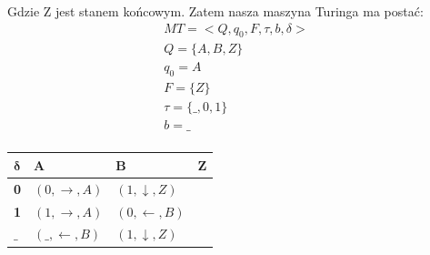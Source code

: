 \documentclass[12pt]{article}
\begin{document}
    Gdzie Z jest stanem końcowym. Zatem nasza maszyna Turinga ma postać:
    \begin{gather*}
        MT = <Q, q_0, F, \tau, b, \delta>\\
        Q = \{A, B, Z\}\\
        q_0 = A\\
        F = \{Z\}\\
        \tau = \{ \_, 0, 1\}\\
        b = \_ \\
    \end{gather*}
    \begin{table}[H]
        \begin{center}
            \begin{tabular}{| p{1cm} || p{5cm} | p{5cm} | p{1cm} |}
                \hline
                $\boldsymbol{\delta}$ & \textbf{A} & \textbf{B} & \textbf{Z}\\
                \hline
                \hline
                \textbf{0} & $(0, \rightarrow, A)$ & $(1, \downarrow, Z)$ &\\
                \hline
                \textbf{1} & $(1, \rightarrow, A)$ & $(0, \leftarrow, B)$ &\\
                \hline
                $\boldsymbol{\_}$ & $(\_, \leftarrow, B)$ & $(1, \downarrow, Z)$ &\\
                \hline
            \end{tabular}
        \end{center}
    \end{table}
\end{document}

